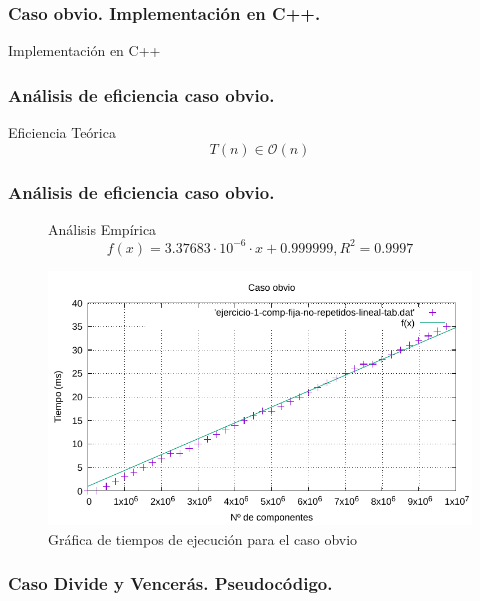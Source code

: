 \documentclass[13pt]{beamer}
\begin{document}
	 \begin{frame}
		\frametitle{Caso obvio. Implementación en C++.}
		\begin{exampleblock}{Implementación en C++}
			 
		\end{exampleblock}	
	\end{frame}

	\begin{frame}
		\frametitle{Análisis de eficiencia caso obvio.}
		 \begin{block}{Eficiencia Teórica}
		 	$$T(n) \in \mathcal{O}(n)$$
		 \end{block}
	\end{frame}
		
	\begin{frame}
		\frametitle{Análisis de eficiencia caso obvio.}
		\begin{figure}
			\begin{block}{Análisis Empírica}
				\begin{equation}
				\boxed{f(x) = 3.37683 \cdot 10^{-6} \cdot x + 0.999999, R^2 = 0.9997}
				\label{eq:1a-obv-regresion}
				\end{equation}
			\end{block}
			
			\centering
			\includegraphics[scale=0.68]{img/e1a-obv}
			\caption{Gráfica de tiempos de ejecución para el caso obvio}
			\label{fig:1a-obv-graph}
		\end{figure}
	\end{frame}

	\begin{frame}
		\frametitle{Caso Divide y Vencerás. Pseudocódigo.}
		
	\end{frame}
\end{document}
